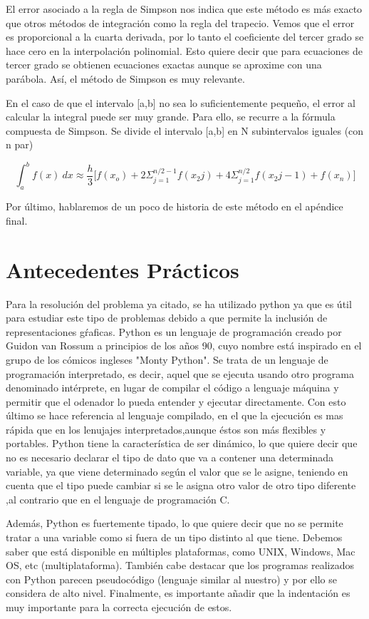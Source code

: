 \documentclass[spanish,a4paper,11pt]{report}
\begin{document}
El error asociado a la regla de Simpson nos indica que este método es más exacto que otros métodos de integración como la regla 
del trapecio. Vemos que el error es proporcional a la cuarta derivada, por lo tanto el coeficiente del tercer grado se hace cero 
en la interpolación polinomial. Esto quiere decir que para ecuaciones de tercer grado se obtienen ecuaciones exactas aunque se 
aproxime con una parábola. Así, el método de Simpson es muy relevante.


En el caso de que el intervalo [a,b] no sea lo suficientemente pequeño, el error al calcular la integral puede ser muy grande. 
Para ello, se recurre a la fórmula compuesta de Simpson. Se divide el intervalo [a,b] en N subintervalos iguales (con n par)

\[\int_a^{b}f(x) \: dx \approx \frac{h}{3} \Bigg[f(x_o)+ 2\Sigma_{j=1}^{n/2-1} f(x_2j) + 4\Sigma_{j=1}^{n/2} f(x_2j-1) + f(x_n)\Bigg]\]

Por último, hablaremos de un poco de historia de este método en el apéndice final.

\section{Antecedentes Prácticos}   
\label{chapter:pra}

Para la resolución del problema ya citado, se ha utilizado python ya que es útil para estudiar este tipo de problemas debido a 
que permite la inclusión de representaciones gŕaficas. 
Python es un lenguaje de programación creado por Guidon van Rossum a principios de los años 90, cuyo nombre está inspirado en 
el grupo de los cómicos ingleses "Monty Python". Se trata de un lenguaje de programación interpretado, es decir, aquel que se 
ejecuta usando otro programa denominado intérprete, en lugar de compilar el código a lenguaje máquina y permitir que el odenador 
lo pueda entender y ejecutar directamente. Con esto último se hace referencia al lenguaje compilado, en el que la ejecución es
mas rápida que en los lenujajes interpretados,aunque éstos son más flexibles y portables. 
Python tiene la característica de ser dinámico, lo que quiere decir que no es necesario declarar el tipo de dato que va a 
contener una determinada variable, ya que viene determinado según el valor que se le asigne, teniendo en cuenta que el tipo 
puede cambiar si se le asigna otro valor de otro tipo diferente ,al contrario que en el lenguaje de programación C.
  
\parindent=1cm Además, Python es fuertemente tipado, lo que quiere decir que no se permite tratar a una variable como si fuera
de un tipo distinto al que tiene. Debemos saber que está disponible en múltiples plataformas, como UNIX, Windows, Mac OS, etc 
(multiplataforma).
También cabe destacar que los programas realizados con Python parecen pseudocódigo (lenguaje similar al nuestro) y por ello se 
considera de alto nivel.
Finalmente, es importante añadir que la indentación es muy importante para la correcta ejecución de estos.
  
\end{document}
